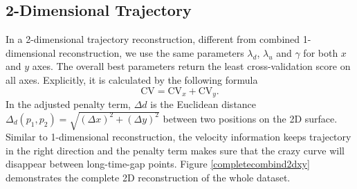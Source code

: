 \subsection{2-Dimensional Trajectory}

In a 2-dimensional trajectory reconstruction, different from combined 1-dimensional reconstruction, we use the same parameters $\lambda_d$, $\lambda_u$ and $\gamma$ for both $x$ and $y$ axes. The overall best parameters return the least cross-validation score on all axes. Explicitly, it is calculated by the following formula 
\begin{equation}
\mbox{CV}=\mbox{CV}_x+\mbox{CV}_y.
\end{equation}
In the adjusted penalty term, $\Delta d$ is the Euclidean distance $\Delta_d(p_1,p_2)=\sqrt{(\Delta x)^2+(\Delta y)^2}$ between two positions on the 2D surface. Similar to 1-dimensional reconstruction, the velocity information keeps trajectory in the right direction and the penalty term makes sure that the crazy curve will disappear between long-time-gap points. Figure \ref{completecombind2dxy} demonstrates the complete 2D reconstruction of the whole dataset.  

